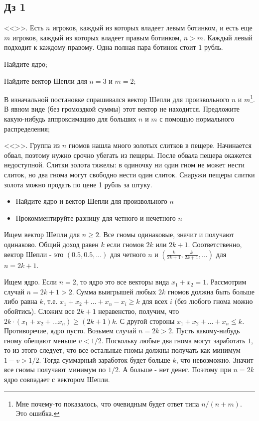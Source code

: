 
\subsection{Дз 1}

\vspace{5pt} <<>>. Есть $n$ игроков, каждый из которых владеет левым ботинком, и есть еще $m$ игроков, каждый из которых владеет правым ботинком, $n>m$. Каждый левый подходит к каждому правому. Одна полная пара ботинок стоит 1 рубль.  

Найдите ядро;

Найдите вектор Шепли для $n=3$ и $m=2$;

В изначальной постановке спрашивался вектор Шепли для произвольного $n$ и $m$\footnote{Мне почему-то показалось, что очевидным будет ответ типа $n/(n+m)$. Это ошибка.}. В явном виде (без громоздкой суммы) этот вектор не находится. Предложите какую-нибудь аппроксимацию для больших $n$ и $m$ с помощью нормального распределения;

\vspace{5pt} <<>>. Группа из $n$ гномов нашла много золотых слитков в пещере. Начинается обвал, поэтому нужно срочно убегать из пещеры. После обвала пещера окажется недоступной. Слитки золота тяжелы: в одиночку ни один гном не может нести слиток, но два гнома могут свободно нести один слиток. Снаружи пещеры слитки золота можно продать по цене 1 рубль за штуку. 
\begin{itemize}
\item Найдите ядро и вектор Шепли для произвольного $n$
\item Прокомментируйте разницу для четного и нечетного $n$
\end{itemize}

Ищем вектор Шепли для $n\geq 2$. Все гномы одинаковые, значит и получают одинаково. Общий доход равен $k$ если гномов $2k$ или $2k+1$. Соответственно, вектор Шепли - это $(0.5,0.5,...)$ для четного $n$ и $(\frac{k}{2k+1},\frac{k}{2k+1},...)$ для $n=2k+1$.

Ищем ядро. Если $n=2$, то ядро это все векторы вида $x_{1}+x_{2}=1$. Рассмотрим случай $n=2k+1>2$. Сумма выигрышей любых $2k$ гномов должна быть больше либо равна $k$, т.е. $x_{1}+x_{2}+...+x_{n}-x_{i}\geq k$ для всех $i$ (без любого гнома можно обойтись). Сложим все $2k+1$ неравенство, получим, что $2k\cdot (x_{1}+x_{2}+...x_{n})\geq (2k+1)k$. С другой стороны $x_{1}+x_{2}+...+x_{n}\leq k$. Противоречие, ядро пусто. Возьмем случай $n=2k>2$. Пусть какому-нибудь гному обещают меньше $v<1/2$. Поскольку любые два гнома могут заработать $1$, то из этого следует, что все остальные гномы должны получать как минимум $1-v>1/2$. Тогда суммарный заработок будет больше $k$, что невозможно. Значит все гномы получают минимум по $1/2$. А больше  - нет денег. Поэтому при $n=2k$ ядро совпадает с вектором Шепли.

